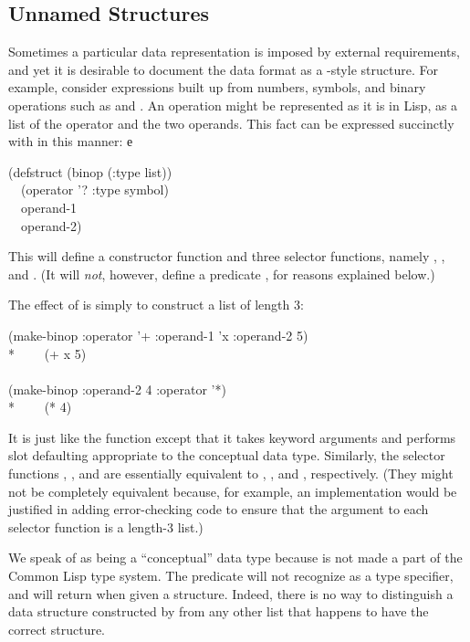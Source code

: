 \subsection{Unnamed Structures}

Sometimes a particular data representation is imposed by external requirements,
and yet it is desirable to document the data format as a -style
structure.  For example, consider expressions built up from numbers,
symbols, and binary operations such as \cdf{+} and \cdf{*}.  An operation
might be represented as it is in Lisp, as a list of the operator
and the two operands.  This fact can be expressed succinctly with 
in this manner:
е\begin{lisp}
(defstruct (binop (:type list)) \\
~~(operator '? :type symbol) \\
~~operand-1 \\
~~operand-2)
\end{lisp}
This will define a constructor function  and three
selector functions, namely , ,
and .  (It will \emph{not}, however, define a predicate
, for reasons explained below.)

The effect of  is simply to construct a list of length 3:
\begin{lisp}
(make-binop :operator '+ :operand-1 'x :operand-2 5) \\*
~~~\EV\ (+ x 5) \\
\\
(make-binop :operand-2 4 :operator '*) \\*
~~~\EV\ (* {\nil} 4)
\end{lisp}
It is just like the function  except that it takes
keyword arguments and performs slot defaulting appropriate to the 
conceptual data type.  Similarly, the selector functions
, ,
and  are essentially equivalent to ,
, and , respectively.  (They might not be
completely equivalent because,
for example, an implementation would be justified in adding error-checking
code to ensure that the argument to each selector function is a length-3
list.)

We speak of  as being a ``conceptual'' data type because 
is not made a part of the Common Lisp type system.  The predicate
 will not recognize  as a type specifier, and 
will return  when given a  structure.  Indeed, there is
no way to distinguish a data structure constructed by 
from any other list that happens to have the correct structure.

